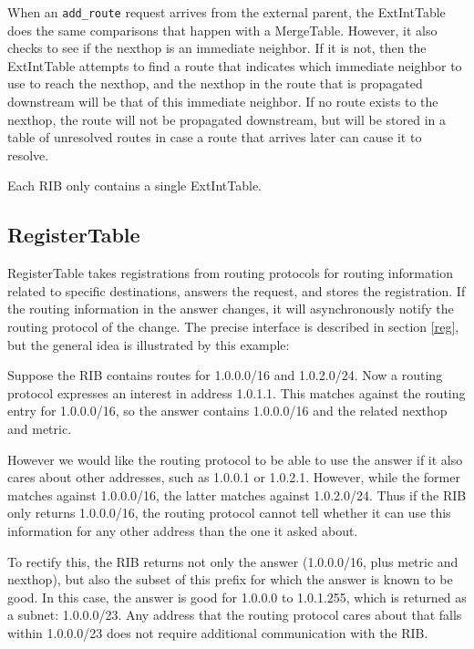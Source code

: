 \documentclass[11pt]{article}
\begin{document}
When an {\tt add\_route} request arrives from the external parent, the
ExtIntTable does the same comparisons that happen with a MergeTable.
However, it also checks to see if the nexthop is an immediate
neighbor.  If it is not, then the ExtIntTable attempts to find a route
that indicates which immediate neighbor to use to reach the nexthop,
and the nexthop in the route that is propagated downstream will be
that of this immediate neighbor.  If no route exists to the nexthop,
the route will not be propagated downstream, but will be stored in a
table of unresolved routes in case a route that arrives later can
cause it to resolve.

Each RIB only contains a single ExtIntTable.

\subsection{RegisterTable}

RegisterTable takes registrations from routing protocols for routing
information related to specific destinations, answers the request, and
stores the registration.  If the routing information in the
answer changes, it will asynchronously notify the routing protocol of
the change.  The precise interface is described in section \ref{reg},
but the general idea is illustrated by this example:

Suppose the RIB contains routes for 1.0.0.0/16 and 1.0.2.0/24.  Now a
routing protocol expresses an interest in address 1.0.1.1.  This
matches against the routing entry for 1.0.0.0/16, so the answer contains
1.0.0.0/16 and the related nexthop and metric.

However we would like the routing protocol to be able to use the
answer if it also cares about other addresses, such as 1.0.0.1 or
1.0.2.1.  However, while the former matches against 1.0.0.0/16, the
latter matches against 1.0.2.0/24.  Thus if the RIB only returns
1.0.0.0/16, the routing protocol cannot tell whether it can use this
information for any other address than the one it asked about.

To rectify this, the RIB returns not only the answer (1.0.0.0/16, plus
metric and nexthop), but also the subset of this prefix for which the
answer is known to be good.  In this case, the answer is good for
1.0.0.0 to 1.0.1.255, which is returned as a subnet: 1.0.0.0/23.
Any address that the routing protocol cares about that falls within
1.0.0.0/23 does not require additional communication with the RIB.
\end{document}
